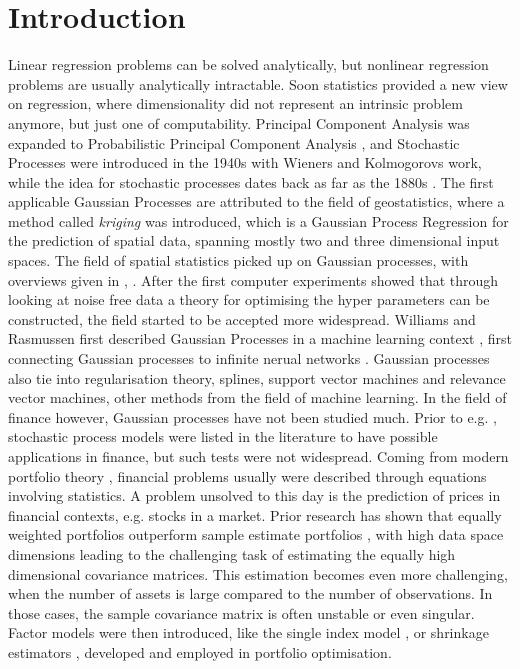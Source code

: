 \chapter{Introduction}
\label{sec:einleitung}
Linear regression problems can be solved analytically, but nonlinear regression problems are usually analytically intractable. Soon statistics provided a new view on regression, where dimensionality did not represent an intrinsic problem anymore, but just one of computability. Principal Component Analysis was expanded to Probabilistic Principal Component Analysis \cite{Bishop_1999}, and Stochastic Processes were introduced in the 1940s with Wieners \cite{Wiener_1940} and Kolmogorovs \cite{Kolmogoroff_1941} work, while the idea for stochastic processes dates back as far as the 1880s \cite{Thiele_1880} \cite{Lauritzen_1981}. The first applicable Gaussian Processes are attributed to the field of geostatistics, where a method called \textit{kriging} \cite{Matheron_1973} \cite{Journel_1976} was introduced, which is a Gaussian Process Regression for the prediction of spatial data, spanning mostly two and three dimensional input spaces. The field of spatial statistics picked up on Gaussian processes, with overviews given in \cite{Ripley_2005}, \cite{Cressie_1993}. After the first computer experiments showed that through looking at noise free data a theory for optimising the hyper parameters can be constructed, the field started to be accepted more widespread. Williams and Rasmussen first described Gaussian Processes in a machine learning context \cite{Williams_Rasmussen_1996}, first connecting Gaussian processes to infinite nerual networks \cite{Neal_1996}. Gaussian processes also tie into regularisation theory, splines, support vector machines and relevance vector machines, other methods from the field of machine learning. \newline \newline
In the field of finance however, Gaussian processes have not been studied much. Prior to e.g. \cite{Nirwan_2019}, stochastic process models were listed in the literature to have possible applications in finance, but such tests were not widespread. Coming from modern portfolio theory \cite{Markowitz_1952}, financial problems usually were described through equations involving statistics. A problem unsolved to this day is the prediction of prices in financial contexts, e.g. stocks in a market. Prior research has shown that equally weighted portfolios outperform sample estimate portfolios \cite{Jobson_Korkie_1981}, with high data space dimensions leading to the challenging task of estimating the equally high dimensional covariance matrices. This estimation becomes even more challenging, when the number of assets is large compared to the number of observations. In those cases, the sample covariance matrix is often unstable or even singular. Factor models were then introduced, like the single index model \cite{Sharpe_1991}, or shrinkage estimators \cite{Ledoit_2004}, developed and employed in portfolio optimisation. \newline
